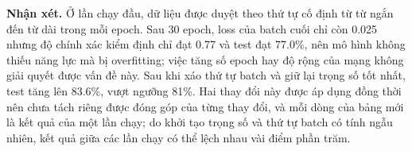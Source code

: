 \textbf{Nhận xét.} Ở lần chạy đầu, dữ liệu được duyệt theo thứ tự cố định từ từ
ngắn đến từ dài trong mỗi epoch. Sau 30 epoch, loss của batch cuối chỉ còn 0.025
nhưng độ chính xác kiểm định chỉ đạt 0.77 và test đạt 77.0\%, nên mô hình không
thiếu năng lực mà bị overfitting; việc tăng số epoch hay độ rộng của mạng không
giải quyết được vấn đề này. Sau khi xáo thứ tự batch và giữ lại trọng số tốt
nhất, test tăng lên 83.6\%, vượt ngưỡng 81\%. Hai thay đổi này được áp dụng
đồng thời nên chưa tách riêng được đóng góp của từng thay đổi, và mỗi dòng của
bảng mới là kết quả của một lần chạy; do khởi tạo trọng số và thứ tự batch có
tính ngẫu nhiên, kết quả giữa các lần chạy có thể lệch nhau vài điểm phần trăm.
